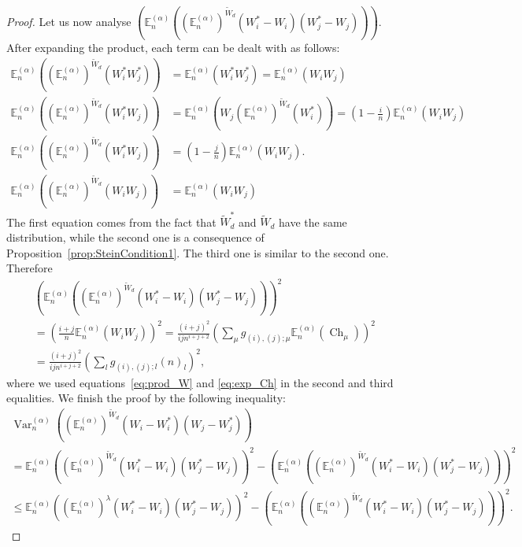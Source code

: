 \documentclass[11pt]{amsart}
\theoremstyle{plain}
\theoremstyle{remark}
\newcommand{\esper}{\mathbb{E}}
\DeclareMathOperator{\Var}{Var}
\DeclareMathOperator{\Ch}{Ch}
\begin{document}
\begin{proof}
Let us now analyse 
$\left(\esper_n^{(\alpha)}\left( (\esper_n^{(\alpha)})^{\tilde{W}_d}(W_i^* - W_i)(W_j^* - W_j)\right) \right)$.
After expanding the product, each term can be dealt with as follows:
\begin{align*}
    \esper_n^{(\alpha)}\left( (\esper_n^{(\alpha)})^{\tilde{W}_d}( W_i^* W_j^*) \right)&= \esper_n^{(\alpha)}(W_i^* W_j^*)=
    \esper_n^{(\alpha)}(W_i W_j) \\
    \esper_n^{(\alpha)}\left( (\esper_n^{(\alpha)})^{\tilde{W}_d}( W_i^* W_j) \right)&= \esper_n^{(\alpha)}\left(W_j (\esper_n^{(\alpha)})^{\tilde{W}_d}( W_i^*)\right)=\left( 1-\frac{i}{n} \right) \esper_n^{(\alpha)} (W_i W_j)\\
\esper_n^{(\alpha)}\left( (\esper_n^{(\alpha)})^{\tilde{W}_d}( W_i^* W_j) \right)&=
    \left( 1-\frac{j}{n} \right) \esper_n^{(\alpha)} (W_i W_j).\\
    \esper_n^{(\alpha)}\left( (\esper_n^{(\alpha)})^{\tilde{W}_d}( W_i W_j) \right)&=
    \esper_n^{(\alpha)}(W_i W_j) 
\end{align*}
The first equation comes from the fact that $\tilde{W}_d^*$ and $\tilde{W}_d$
have the same distribution, while the second one is a consequence of Proposition~\ref{prop:SteinCondition1}.
The third one is similar to the second one.
Therefore
\begin{multline}
\left(\esper_n^{(\alpha)}\left( (\esper_n^{(\alpha)})^{\tilde{W}_d}(W_i^* - W_i)(W_j^* - W_j)\right) \right)^2\\
= \left( \frac{i+j}{n} \esper_n^{(\alpha)}(W_iW_j) \right)^2 = \frac{(i+j)^2}{ij n^{i+j+2}}\left(\sum_\mu g_{(i), (j); \mu} \esper_n^{(\alpha)}(\Ch_\mu)\right)^2\\
=\frac{(i+j)^2}{ij n^{i+j+2}} \left(\sum_l g_{(i), (j);l} (n)_l\right)^2,
\end{multline}
where we used equations~\eqref{eq:prod_W} and \eqref{eq:exp_Ch}
in the second and third equalities.
We finish the proof by the following inequality:
\begin{multline}
\Var_n^{(\alpha)}\left((\esper_n^{(\alpha)})^{\tilde{W}_d}(W_i - W_i^*)(W_j - W_j^*)\right) \\
= \esper_n^{(\alpha)}\left((\esper_n^{(\alpha)})^{\tilde{W}_d}(W_i^* - W_i)(W_j^* - W_j) \right)^2 - \left(\esper_n^{(\alpha)}\left( (\esper_n^{(\alpha)})^{\tilde{W}_d}(W_i^* - W_i)(W_j^* - W_j)\right) \right)^2 \\
\leq \esper_n^{(\alpha)}\left((\esper_n^{(\alpha)})^\lambda(W_i^* - W_i)(W_j^* - W_j) \right)^2 - \left(\esper_n^{(\alpha)}\left( (\esper_n^{(\alpha)})^{\tilde{W}_d}(W_i^* - W_i)(W_j^* - W_j)\right) \right)^2.
\end{multline}
\end{proof}
\end{document}
